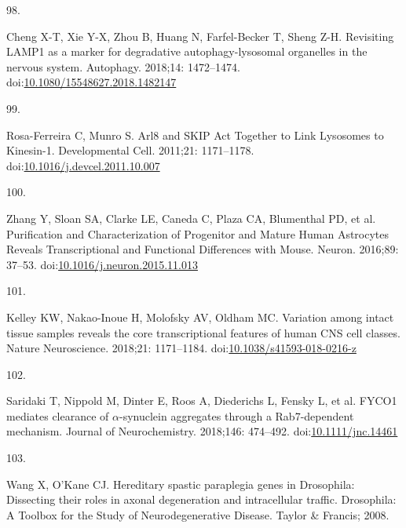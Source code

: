 \documentclass[
  12pt,
  a4paper,
]{book}
\newlength{\cslhangindent}
\newlength{\csllabelwidth}
\newlength{\cslentryspacingunit} %
\newenvironment{CSLReferences}[2] %
 {%
  \setlength{\parindent}{0pt}
  \ifodd #1
  \let\oldpar\par
  \def\par{\hangindent=\cslhangindent\oldpar}
  \fi
  \setlength{\parskip}{#2\cslentryspacingunit}
 }%
 {}
\newcommand{\CSLLeftMargin}[1]{\parbox[t]{\csllabelwidth}{#1}}
\newcommand{\CSLRightInline}[1]{\parbox[t]{\linewidth - \csllabelwidth}{#1}\break}
\begin{document}
\begin{CSLReferences}{0}{0}
\leavevmode{}%
\CSLLeftMargin{98. }%
\CSLRightInline{Cheng X-T, Xie Y-X, Zhou B, Huang N, Farfel-Becker T, Sheng Z-H. Revisiting {LAMP1} as a marker for degradative autophagy-lysosomal organelles in the nervous system. Autophagy. 2018;14: 1472--1474. doi:\href{https://doi.org/10.1080/15548627.2018.1482147}{10.1080/15548627.2018.1482147}}

\leavevmode{}%
\CSLLeftMargin{99. }%
\CSLRightInline{Rosa-Ferreira C, Munro S. Arl8 and {SKIP Act Together} to {Link Lysosomes} to {Kinesin-1}. Developmental Cell. 2011;21: 1171--1178. doi:\href{https://doi.org/10.1016/j.devcel.2011.10.007}{10.1016/j.devcel.2011.10.007}}

\leavevmode{}%
\CSLLeftMargin{100. }%
\CSLRightInline{Zhang Y, Sloan SA, Clarke LE, Caneda C, Plaza CA, Blumenthal PD, et al. Purification and {Characterization} of {Progenitor} and {Mature Human Astrocytes Reveals Transcriptional} and {Functional Differences} with {Mouse}. Neuron. 2016;89: 37--53. doi:\href{https://doi.org/10.1016/j.neuron.2015.11.013}{10.1016/j.neuron.2015.11.013}}

\leavevmode{}%
\CSLLeftMargin{101. }%
\CSLRightInline{Kelley KW, Nakao-Inoue H, Molofsky AV, Oldham MC. Variation among intact tissue samples reveals the core transcriptional features of human {CNS} cell classes. Nature Neuroscience. 2018;21: 1171--1184. doi:\href{https://doi.org/10.1038/s41593-018-0216-z}{10.1038/s41593-018-0216-z}}

\leavevmode{}%
\CSLLeftMargin{102. }%
\CSLRightInline{Saridaki T, Nippold M, Dinter E, Roos A, Diederichs L, Fensky L, et al. {FYCO1} mediates clearance of {\(\alpha\)}-synuclein aggregates through a {Rab7-dependent} mechanism. Journal of Neurochemistry. 2018;146: 474--492. doi:\href{https://doi.org/10.1111/jnc.14461}{10.1111/jnc.14461}}

\leavevmode{}%
\CSLLeftMargin{103. }%
\CSLRightInline{Wang X, O'Kane CJ. Hereditary spastic paraplegia genes in {Drosophila}: Dissecting their roles in axonal degeneration and intracellular traffic. Drosophila: {A Toolbox} for the {Study} of {Neurodegenerative Disease}. {Taylor \& Francis}; 2008. }


\end{CSLReferences}
\end{document}
